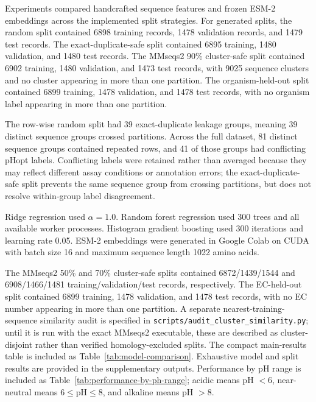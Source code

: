 Experiments compared handcrafted sequence features and frozen ESM-2 embeddings across the implemented split strategies. For generated splits, the random split contained 6898 training records, 1478 validation records, and 1479 test records. The exact-duplicate-safe split contained 6895 training, 1480 validation, and 1480 test records. The MMseqs2 90\% cluster-safe split contained 6902 training, 1480 validation, and 1473 test records, with 9025 sequence clusters and no cluster appearing in more than one partition. The organism-held-out split contained 6899 training, 1478 validation, and 1478 test records, with no organism label appearing in more than one partition.

The row-wise random split had 39 exact-duplicate leakage groups, meaning 39 distinct sequence groups crossed partitions. Across the full dataset, 81 distinct sequence groups contained repeated rows, and 41 of those groups had conflicting pHopt labels. Conflicting labels were retained rather than averaged because they may reflect different assay conditions or annotation errors; the exact-duplicate-safe split prevents the same sequence group from crossing partitions, but does not resolve within-group label disagreement.

Ridge regression used \(\alpha = 1.0\). Random forest regression used 300 trees and all available worker processes. Histogram gradient boosting used 300 iterations and learning rate 0.05. ESM-2 embeddings were generated in Google Colab on CUDA with batch size 16 and maximum sequence length 1022 amino acids.

The MMseqs2 50\% and 70\% cluster-safe splits contained 6872/1439/1544 and 6908/1466/1481 training/validation/test records, respectively. The EC-held-out split contained 6899 training, 1478 validation, and 1478 test records, with no EC number appearing in more than one partition. A separate nearest-training-sequence similarity audit is specified in \texttt{scripts/audit\_cluster\_similarity.py}; until it is run with the exact MMseqs2 executable, these are described as cluster-disjoint rather than verified homology-excluded splits. The compact main-results table is included as Table~\ref{tab:model-comparison}. Exhaustive model and split results are provided in the supplementary outputs. Performance by pH range is included as Table~\ref{tab:performance-by-ph-range}; acidic means pH $<6$, near-neutral means $6\leq\mathrm{pH}\leq8$, and alkaline means pH $>8$.


